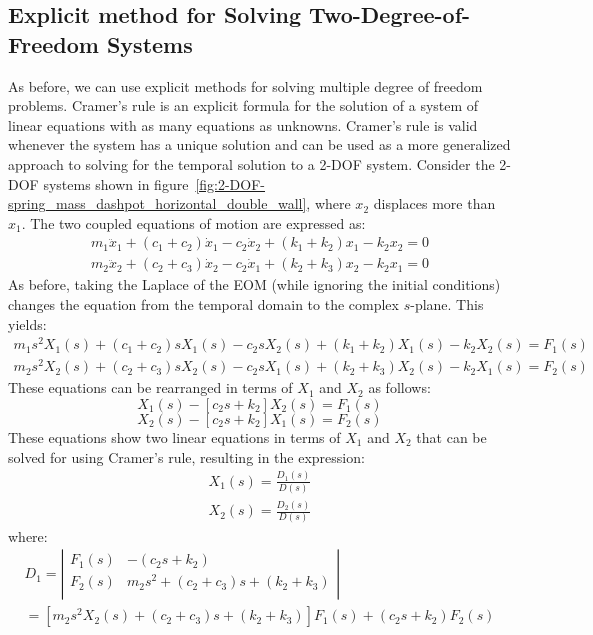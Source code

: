 \documentclass[12pt,letter]{article}
\begin{document}
\subsection{Explicit method for Solving Two-Degree-of-Freedom Systems}





As before, we can use explicit methods for solving multiple degree of freedom problems. 
Cramer's rule is an explicit formula for the solution of a system of linear equations with as many equations as unknowns. Cramer's rule is valid whenever the system has a unique solution and can be used as a more generalized approach to solving for the temporal solution to a 2-DOF system. Consider the 2-DOF systems shown in figure~\ref{fig:2-DOF-spring_mass_dashpot_horizontal_double_wall}, where $x_2$ displaces more than $x_1$. The two coupled equations of motion are expressed as: 
\begin{eqnarray}
m_1\ddot{x}_1 + (c_1+c_2)\dot{x}_1 - c_2\dot{x}_2 + (k_1+k_2)x_1 - k_2x_2 =0 \\
m_2\ddot{x}_2 + (c_2+c_3)\dot{x}_2 - c_2\dot{x}_1 + (k_2+k_3)x_2 - k_2x_1 =0 \nonumber
\end{eqnarray}
As before, taking the Laplace of the EOM (while ignoring the initial conditions) changes the equation from the temporal domain to the complex $s$-plane. This yields:
\begin{eqnarray}
m_1 s^2 X_1(s) + (c_1 + c_2)sX_1(s) - c_2sX_2(s) + (k_1+k_2)X_1(s) - k_2X_2(s) = F_1(s) \\
m_2 s^2 X_2(s) + (c_2 + c_3)sX_2(s) - c_2sX_1(s) + (k_2+k_3)X_2(s) - k_2X_1(s) = F_2(s) \nonumber
\end{eqnarray}
These equations can be rearranged in terms of $X_1$ and $X_2$ as follows:
\begin{equation}
[m_1 s^2 + (c_1 + c_2)s + (k_1+k_2)]X_1(s) - [c_2s+k_2]X_2(s) = F_1(s) 
\end{equation}
\begin{equation}
[m_2 s^2 + (c_2 + c_3)s + (k_2+k_3)]X_2(s) - [c_2s+k_2]X_1(s) = F_2(s) \nonumber
\end{equation}
These equations show two linear equations in terms of $X_1$ and $X_2$ that can be solved for using Cramer's rule, resulting in the expression:
		\vspace{-1ex}	
\begin{eqnarray}
X_1(s) = \frac{D_1(s)}{D(s)} \\
X_2(s) = \frac{D_2(s)}{D(s)} \nonumber
\end{eqnarray}
	\vspace{-1ex}	
where:
	\vspace{-1ex}	
\begin{eqnarray}
D_1 = \left|
\begin{array}{cc}
F_1(s)  & -(c_2s+k_2) \\
F_2(s)  & m_2 s^2 + (c_2 + c_3)s + (k_2+k_3) \\
\end{array}
\right| \\
= [m_2 s^2 X_2(s) + (c_2 + c_3)s +(k_2+k_3)]F_1(s) + (c_2s+k_2)F_2(s)  \nonumber
\end{eqnarray}
\end{document}
